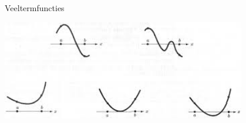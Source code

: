 \documentclass[12pt]{article}
\begin{document}
\pagestyle{fancy}
\lhead{}

\begin{theorie}

\thispagestyle{empty}
\begin{center}
  \begin{mdframed}
    \centering
    \fontsize{35}{70}\selectfont Veeltermfuncties
  \end{mdframed}
  \vfill
  \includegraphics[width=0.8\textwidth]{veeltermen}
  \vfill
\end{center}
\vspace*{-2cm}


\end{theorie}
\end{document}
